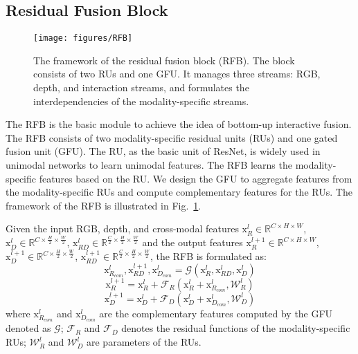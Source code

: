 \documentclass[letterpaper, 10 pt, conference]{ieeeconf}
\begin{document}
	\subsection{Residual Fusion Block}
	\begin{figure}[!tb]
		\centering
		\texttt{[image: figures/RFB]}
		\caption{The framework of the residual fusion block (RFB). The block consists of two RUs and one GFU. It manages three streams: RGB, depth, and interaction streams, and formulates the interdependencies of the modality-specific streams. }
		\label{fig_RFB}
	\end{figure}
The RFB is the basic module to achieve the idea of bottom-up interactive fusion. The RFB consists of two modality-specific residual units (RUs) and one gated fusion unit (GFU). The RU, as the basic unit of ResNet\cite{he2016deep}, is widely used in unimodal networks to learn unimodal features. The RFB learns the modality-specific features based on the RU. We design the GFU to aggregate features from the modality-specific RUs and compute complementary features for the RUs. The framework of the RFB is illustrated in Fig.~\ref{fig_RFB}.
	
	
	Given the input RGB, depth, and cross-modal features $\mathrm{x}^l_R\in \mathbb{R}^{C\times H\times W}$, $\mathrm{x}^l_D\in \mathbb{R}^{C\times \frac{H}{2}\times \frac{W}{2}}$, $\mathrm{x}^l_{RD}\in \mathbb{R}^{\frac{C}{2}\times \frac{H}{2}\times \frac{W}{2}}$ and the output features $\mathrm{x}^{l+1}_R\in \mathbb{R}^{C\times H\times W}$, $\mathrm{x}^{l+1}_D\in \mathbb{R}^{C\times \frac{H}{2}\times \frac{W}{2}}$, $\mathrm{x}^{l+1}_{RD}\in \mathbb{R}^{\frac{C}{2}\times \frac{H}{2}\times \frac{W}{2}}$, the RFB is formulated as:
	\begin{equation}
	\mathrm{x}^{l}_{R_{com}}, \mathrm{x}^{l+1}_{RD}, \mathrm{x}^{l}_{D_{com}} = \mathcal{G}(\mathrm{x}^l_R, \mathrm{x}^{l}_{RD}, \mathrm{x}^l_D)
	\label{GFU}
	\end{equation}
	\begin{equation}
	\mathrm{x}^{l+1}_{R}=\mathrm{x}^{l}_{R} + \mathcal{F}_{R}(\mathrm{x}^{l}_{R} + \mathrm{x}^{l}_{R_{com}}, \mathcal{W}^l_R)
	\label{RU1}
	\end{equation}
	\begin{equation}
	\mathrm{x}^{l+1}_{D}=\mathrm{x}^{l}_{D} + \mathcal{F}_{D}(\mathrm{x}^{l}_{D} + \mathrm{x}^{l}_{D_{com}}, \mathcal{W}^l_D)
	\label{RU2}
	\end{equation}
	where $\mathrm{x}^{l}_{R_{com}}$ and $\mathrm{x}^{l}_{D_{com}}$ are the complementary features computed by the GFU denoted as $\mathcal{G}$; $\mathcal{F}_{R}$ and $\mathcal{F}_{D}$ denotes the residual functions of the modality-specific RUs; $\mathcal{W}^l_R$ and $\mathcal{W}^l_D$ are parameters of the RUs. 
	
\end{document}
